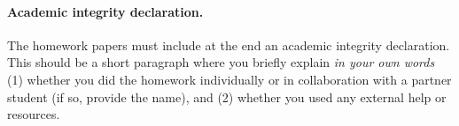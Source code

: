 \documentclass[11pt]{article}
\begin{document}
\newpage
\paragraph{Academic integrity declaration.}
The homework papers must include at the end an academic integrity declaration. This should be a short paragraph where you briefly explain 
\emph{in your own words}  (1) whether you did the homework individually or in collaboration with a partner student (if so, provide the name), 
and (2) whether you used any external help or resources. 

\end{document}
